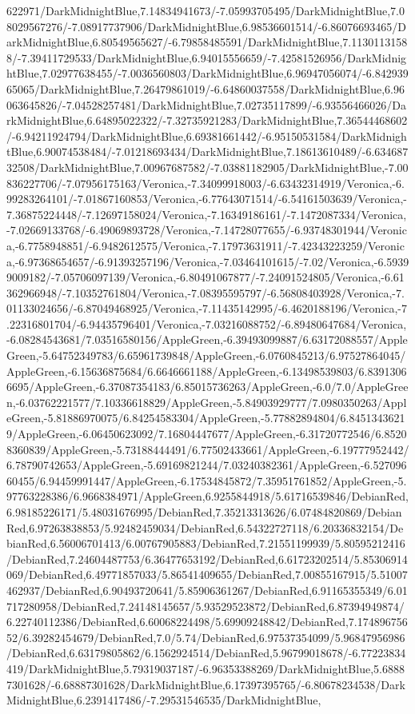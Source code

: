 {\begin{tikzternal}
622971/DarkMidnightBlue,7.14834941673/-7.05993705495/DarkMidnightBlue,7.08029567276/-7.08917737906/DarkMidnightBlue,6.98536601514/-6.86076693465/DarkMidnightBlue,6.80549565627/-6.79858485591/DarkMidnightBlue,7.11301131588/-7.39411729533/DarkMidnightBlue,6.94015556659/-7.42581526956/DarkMidnightBlue,7.02977638455/-7.0036560803/DarkMidnightBlue,6.96947056074/-6.84293965065/DarkMidnightBlue,7.26479861019/-6.64860037558/DarkMidnightBlue,6.96063645826/-7.04528257481/DarkMidnightBlue,7.02735117899/-6.93556466026/DarkMidnightBlue,6.64895022322/-7.32735921283/DarkMidnightBlue,7.36544468602/-6.94211924794/DarkMidnightBlue,6.69381661442/-6.95150531584/DarkMidnightBlue,6.90074538484/-7.01218693434/DarkMidnightBlue,7.18613610489/-6.63468732508/DarkMidnightBlue,7.00967687582/-7.03881182905/DarkMidnightBlue,-7.00836227706/-7.07956175163/Veronica,-7.34099918003/-6.63432314919/Veronica,-6.99283264101/-7.01867160853/Veronica,-6.77643071514/-6.54161503639/Veronica,-7.36875224448/-7.12697158024/Veronica,-7.16349186161/-7.1472087334/Veronica,-7.02669133768/-6.49069893728/Veronica,-7.14728077655/-6.93748301944/Veronica,-6.7758948851/-6.9482612575/Veronica,-7.17973631911/-7.42343223259/Veronica,-6.97368654657/-6.91393257196/Veronica,-7.03464101615/-7.02/Veronica,-6.59399009182/-7.05706097139/Veronica,-6.80491067877/-7.24091524805/Veronica,-6.61362966948/-7.10352761804/Veronica,-7.08395595797/-6.56808403928/Veronica,-7.01133024656/-6.87049468925/Veronica,-7.11435142995/-6.4620188196/Veronica,-7.22316801704/-6.94435796401/Veronica,-7.03216088752/-6.89480647684/Veronica,-6.08284543681/7.03516580156/AppleGreen,-6.39493099887/6.63172088557/AppleGreen,-5.64752349783/6.65961739848/AppleGreen,-6.0760845213/6.97527864045/AppleGreen,-6.15636875684/6.6646661188/AppleGreen,-6.13498539803/6.83913066695/AppleGreen,-6.37087354183/6.85015736263/AppleGreen,-6.0/7.0/AppleGreen,-6.03762221577/7.10336618829/AppleGreen,-5.84903929777/7.0980350263/AppleGreen,-5.81886970075/6.84254583304/AppleGreen,-5.77882894804/6.84513436219/AppleGreen,-6.06450623092/7.16804447677/AppleGreen,-6.31720772546/6.85208360839/AppleGreen,-5.73188444491/6.77502433661/AppleGreen,-6.19777952442/6.78790742653/AppleGreen,-5.69169821244/7.03240382361/AppleGreen,-6.52709660455/6.94459991447/AppleGreen,-6.17534845872/7.35951761852/AppleGreen,-5.97763228386/6.9668384971/AppleGreen,6.9255844918/5.61716539846/DebianRed,6.98185226171/5.48031676995/DebianRed,7.35213313626/6.07484820869/DebianRed,6.97263838853/5.92482459034/DebianRed,6.54322727118/6.20336832154/DebianRed,6.56006701413/6.00767905883/DebianRed,7.21551199939/5.80595212416/DebianRed,7.24604487753/6.36477653192/DebianRed,6.61723202514/5.85306914069/DebianRed,6.49771857033/5.86541409655/DebianRed,7.00855167915/5.51007462937/DebianRed,6.90493720641/5.85906361267/DebianRed,6.91165355349/6.01717280958/DebianRed,7.24148145657/5.93529523872/DebianRed,6.87394949874/6.22740112386/DebianRed,6.60068224498/5.69909248842/DebianRed,7.17489675652/6.39282454679/DebianRed,7.0/5.74/DebianRed,6.97537354099/5.96847956986/DebianRed,6.63179805862/6.1562924514/DebianRed,5.96799018678/-6.77223834419/DarkMidnightBlue,5.79319037187/-6.96353388269/DarkMidnightBlue,5.68887301628/-6.68887301628/DarkMidnightBlue,6.17397395765/-6.80678234538/DarkMidnightBlue,6.2391417486/-7.29531546535/DarkMidnightBlue,
\end{tikzternal}}
